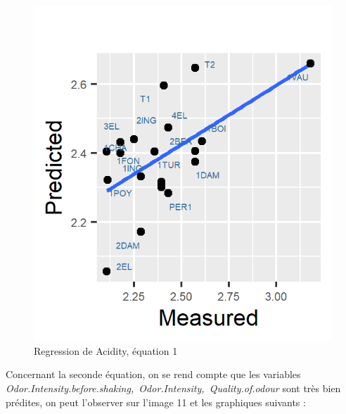 \documentclass[a4paper,french,10pt]{article}
\begin{document}
\begin{figure}[htp] 
	\centering
	\includegraphics[scale=1.2]{images/Pred_Eq_A.png}
	\caption{Regression de Acidity, équation 1}
\end{figure}

\newpage

Concernant la seconde équation, on se rend compte que les variables \textit{Odor.Intensity.before.shaking,~Odor.Intensity,~Quality.of.odour} sont très bien prédites, on peut l'observer sur l'image 11 et les graphiques suivants : 
\end{document}
